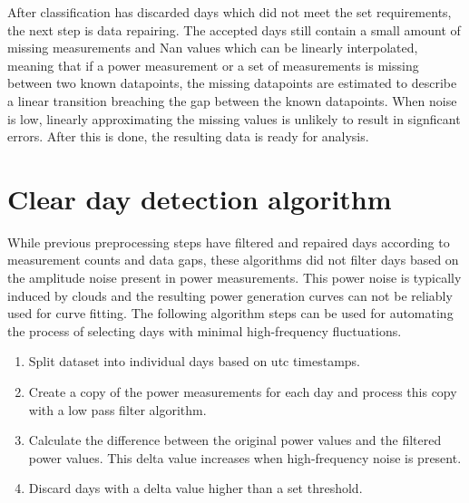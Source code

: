 After classification has discarded days which did not meet the set requirements, the next step is data repairing. The accepted days still contain a small amount of missing measurements and Nan values which can be linearly interpolated, meaning that if a power measurement or a set of measurements is missing between two known datapoints, the missing datapoints are estimated to describe a linear transition breaching the gap between the known datapoints. When noise is low, linearly approximating the missing values is unlikely to result in signficant errors. After this is done, the resulting data is ready for analysis.



\section{Clear day detection algorithm}
\label{clearskyalgo_chapter}
While previous preprocessing steps have filtered and repaired days according to measurement counts and data gaps, these algorithms did not filter days based on the amplitude noise present in power measurements. This power noise is typically induced by clouds and the resulting power generation curves can not be reliably used for curve fitting. The following algorithm steps can be used for automating the process of selecting days with minimal high-frequency fluctuations.






\begin{enumerate}
  \item Split dataset into individual days based on utc timestamps.
  
  \item Create a copy of the power measurements for each day and process this copy with a low pass filter algorithm.

  
  \item Calculate the difference between the original power values and the filtered power values. This delta value increases when high-frequency noise is present.
  
  
  \item Discard days with a delta value higher than a set threshold.
  

\end{enumerate}



